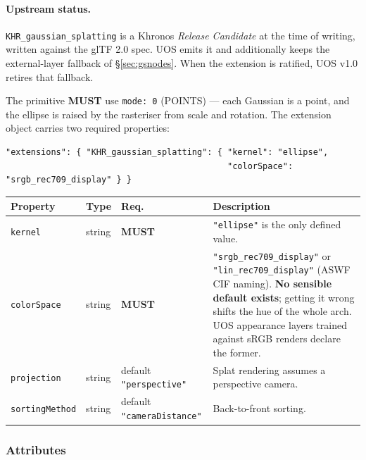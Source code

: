 \documentclass[11pt,a4paper]{article}
\newcommand{\MUST}{\textcolor{uosred}{\textbf{MUST}}}
\newcommand{\code}[1]{\texttt{\small #1}}
\begin{document}
\paragraph{Upstream status.} \code{KHR\_gaussian\_splatting} is a Khronos \emph{Release
Candidate} at the time of writing, written against the glTF 2.0 spec. UOS emits it and
additionally keeps the external-layer fallback of \S\ref{sec:gsnodes}. When the extension
is ratified, UOS v1.0 retires that fallback.

\vspace{6px}
The primitive \MUST{} use \code{mode: 0} (POINTS) --- each Gaussian is a point, and the
ellipse is raised by the rasteriser from scale and rotation. The extension object carries
two required properties:

\begin{lstlisting}[style=js]
"extensions": { "KHR_gaussian_splatting": { "kernel": "ellipse",
                                            "colorSpace": "srgb_rec709_display" } }
\end{lstlisting}

\begin{longtable}{L{3.0cm} L{1.6cm} C{3.2cm} L{7.6cm}}
\toprule
\textbf{Property} & \textbf{Type} & \textbf{Req.} & \textbf{Description}\\
\midrule
\endhead
\code{kernel} & string & \MUST & \code{"ellipse"} is the only defined value.\\
\code{colorSpace} & string & \MUST & \code{"srgb\_rec709\_display"} or
\code{"lin\_rec709\_display"} (ASWF CIF naming). \textbf{No sensible default exists};
getting it wrong shifts the hue of the whole arch. UOS appearance layers trained against
sRGB renders declare the former.\\
\code{projection} & string & default \code{"perspective"} & Splat rendering assumes a
perspective camera.\\
\code{sortingMethod} & string & default \code{"cameraDistance"} & Back-to-front sorting.\\
\bottomrule
\end{longtable}

\subsubsection{Attributes}
\end{document}
